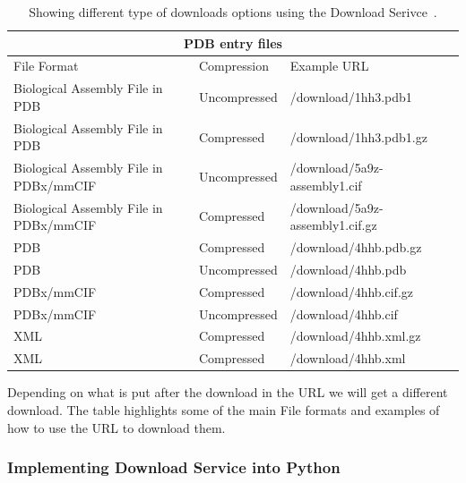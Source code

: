 \documentclass[]{final_report}
\begin{document}
\begin{table}[h]
    \begin{center}
        \begin{tabular}{ |p{5.5cm}|p{2.5cm}|p{6cm}|  }
            \hline
            \multicolumn{3}{|c|}{PDB entry files} \\
            \hline
            File Format&Compression&Example URL\\
            \hline
            Biological Assembly File in PDB&Uncompressed&/download/1hh3.pdb1\\
            \hline
            Biological Assembly File in PDB&Compressed&/download/1hh3.pdb1.gz\\
            \hline
            Biological Assembly File in PDBx/mmCIF&Uncompressed&/download/5a9z-assembly1.cif\\
            \hline
            Biological Assembly File in PDBx/mmCIF&Compressed&/download/5a9z-assembly1.cif.gz\\
            \hline
            PDB&Compressed&/download/4hhb.pdb.gz\\
            \hline
            PDB&Uncompressed&/download/4hhb.pdb\\
            \hline
            PDBx/mmCIF&Compressed&/download/4hhb.cif.gz\\
            \hline
            PDBx/mmCIF&Uncompressed&/download/4hhb.cif\\
            \hline
            XML&Compressed&/download/4hhb.xml.gz\\
            \hline
            XML&Compressed&/download/4hhb.xml\\
            \hline
        \end{tabular}
        \caption{\label{DownloadPDB}Showing different type of downloads options using the Download Serivce~\cite{bank_file_nodate}.} 
    \end{center}
\end{table}
    
Depending on what is put after the download in the URL we will get a different download. The table highlights some of the main File formats and examples of how to use the URL to download them.

\clearpage

\subsubsection{Implementing Download Service into Python}
\end{document}
